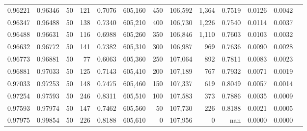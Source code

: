 \begin{tabular}{rrrrrrrrrrrrr}
0.96221 & 0.96346 &    50 & 121 &                                     0.7076 & 605,160 &     450 & 106,592 &   1,364 & 0.7519 & 0.0126 & 0.0042 \\
0.96347 & 0.96488 &    50 & 138 &                                     0.7340 & 605,210 &     400 & 106,730 &   1,226 & 0.7540 & 0.0114 & 0.0037 \\
0.96488 & 0.96631 &    50 & 116 &                                     0.6988 & 605,260 &     350 & 106,846 &   1,110 & 0.7603 & 0.0103 & 0.0032 \\
0.96632 & 0.96772 &    50 & 141 &                                     0.7382 & 605,310 &     300 & 106,987 &     969 & 0.7636 & 0.0090 & 0.0028 \\
0.96773 & 0.96881 &    50 &  77 &                                     0.6063 & 605,360 &     250 & 107,064 &     892 & 0.7811 & 0.0083 & 0.0023 \\
0.96881 & 0.97033 &    50 & 125 &                                     0.7143 & 605,410 &     200 & 107,189 &     767 & 0.7932 & 0.0071 & 0.0019 \\
0.97033 & 0.97253 &    50 & 148 &                                     0.7475 & 605,460 &     150 & 107,337 &     619 & 0.8049 & 0.0057 & 0.0014 \\
0.97254 & 0.97593 &    50 & 246 &                                     0.8311 & 605,510 &     100 & 107,583 &     373 & 0.7886 & 0.0035 & 0.0009 \\
0.97593 & 0.97974 &    50 & 147 &                                     0.7462 & 605,560 &      50 & 107,730 &     226 & 0.8188 & 0.0021 & 0.0005 \\
0.97975 & 0.99854 &    50 & 226 &                                     0.8188 & 605,610 &       0 & 107,956 &       0 &    nan & 0.0000 & 0.0000 \\
\bottomrule
\end{tabular}
